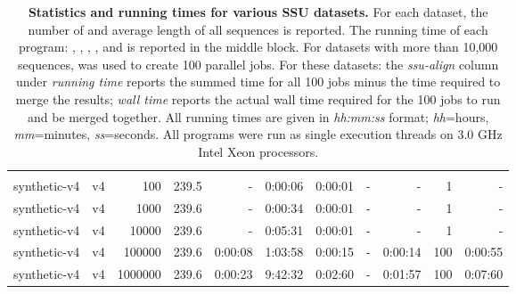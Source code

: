 \begin{table}[hb]
\begin{center}
\begin{tabular}{llrr|rrrrr|rr}
& & & & & & & & & \\
synthetic-v4    & v4       &     100 &  239.5 &         - &   0:00:06 &   0:00:01 &         - &         - &   1 &         - \\%
synthetic-v4    & v4       &    1000 &  239.6 &         - &   0:00:34 &   0:00:01 &         - &         - &   1 &         - \\%
synthetic-v4    & v4       &   10000 &  239.6 &         - &   0:05:31 &   0:00:01 &         - &         - &   1 &         - \\%
synthetic-v4    & v4       &  100000 &  239.6 &   0:00:08 &   1:03:58 &   0:00:15 &         - &   0:00:14 & 100 &   0:00:55 \\%
synthetic-v4    & v4       & 1000000 &  239.6 &   0:00:23 &   9:42:32 &   0:02:60 &         - &   0:01:57 & 100 &   0:07:60 \\%
\end{tabular}
\end{center}
\caption{\textbf{Statistics and running times for various SSU
    datasets.} For each dataset, the number of and average length of all
  sequences is reported. The running time of each program:
  , , , ,
and  is reported in the middle block. For datasets
with more than 10,000 sequences,  was used to create 100 parallel
 jobs. For these datasets: the \emph{ssu-align} column
under \emph{running time} reports the summed time for all 100 jobs
minus the time required to merge the results; \emph{wall time} reports
the actual wall time required for the 100 jobs to run and be merged
together. All running times are given in \emph{hh:mm:ss} format;
\emph{hh}=hours, \emph{mm}=minutes, \emph{ss}=seconds. All
programs were run as single execution threads on 3.0 GHz Intel Xeon
processors.}
\label{tbl:ttimes}
\end{table}

